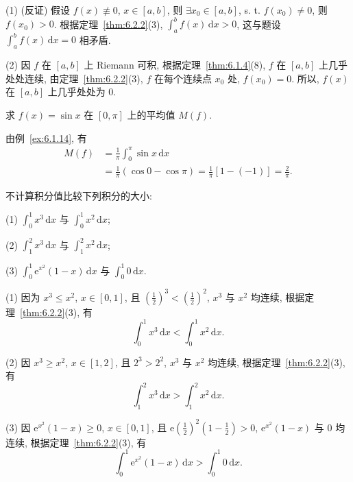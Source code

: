 \begin{solution}
(1) (反证) 假设 $f(x)\not\equiv 0$, $x\in[a,b]$, 则 $\exists x_{0}\in[a,b]$, s. t. $f(x_{0})\neq 0$, 则 $f(x_{0})>0$. 根据定理~\ref{thm:6.2.2}(3), $\int_{a}^{b}f(x)\,\mathrm{d}x>0$, 这与题设 $\int_{a}^{b}f(x)\,\mathrm{d}x=0$ 相矛盾.

(2) 因 $f$ 在 $[a,b]$ 上 Riemann 可积, 根据定理~\ref{thm:6.1.4}(8), $f$ 在 $[a,b]$ 上几乎处处连续, 由定理~\ref{thm:6.2.2}(3), $f$ 在每个连续点 $x_{0}$ 处, $f(x_{0})=0$. 所以, $f(x)$ 在 $[a,b]$ 上几乎处处为 $0$.
\end{solution}

\begin{example}\label{ex:6.2.4}
求 $f(x)=\sin x$ 在 $[0,\pi]$ 上的平均值 $M(f)$.
\end{example}

\begin{solution}
由例~\ref{ex:6.1.14}, 有
\begin{align*}
M(f)&=\frac{1}{\pi}\int_{0}^{\pi}\sin x\,\mathrm{d}x\\
&=\frac{1}{\pi}(\cos 0-\cos\pi)=\frac{1}{\pi}[1-(-1)]=\frac{2}{\pi}.
\end{align*}
\end{solution}

\begin{example}\label{ex:6.2.5}
不计算积分值比较下列积分的大小:

(1) $\int_{0}^{1}x^{3}\,\mathrm{d}x$ 与 $\int_{0}^{1}x^{2}\,\mathrm{d}x$;

(2) $\int_{1}^{2}x^{3}\,\mathrm{d}x$ 与 $\int_{1}^{2}x^{2}\,\mathrm{d}x$;

(3) $\int_{0}^{1}\mathrm{e}^{x^{2}}(1-x)\,\mathrm{d}x$ 与 $\int_{0}^{1}0\,\mathrm{d}x$.
\end{example}

\begin{solution}
(1) 因为 $x^{3}\leqslant x^{2}$, $x\in[0,1]$, 且 $\left(\frac{1}{2}\right)^{3}<\left(\frac{1}{2}\right)^{2}$, $x^{3}$ 与 $x^{2}$ 均连续, 根据定理~\ref{thm:6.2.2}(3), 有
\[
\int_{0}^{1}x^{3}\,\mathrm{d}x<\int_{0}^{1}x^{2}\,\mathrm{d}x.
\]

(2) 因 $x^{3}\geqslant x^{2}$, $x\in[1,2]$, 且 $2^{3}>2^{2}$, $x^{3}$ 与 $x^{2}$ 均连续, 根据定理~\ref{thm:6.2.2}(3), 有
\[
\int_{1}^{2}x^{3}\,\mathrm{d}x>\int_{1}^{2}x^{2}\,\mathrm{d}x.
\]

(3) 因 $\mathrm{e}^{x^{2}}(1-x)\geqslant 0$, $x\in[0,1]$, 且 $\mathrm{e}\left(\frac{1}{2}\right)^{2}\left(1-\frac{1}{2}\right)>0$, $\mathrm{e}^{x^{2}}(1-x)$ 与 $0$ 均连续, 根据定理~\ref{thm:6.2.2}(3), 有
\[
\int_{0}^{1}\mathrm{e}^{x^{2}}(1-x)\,\mathrm{d}x>\int_{0}^{1}0\,\mathrm{d}x.
\]
\end{solution}

